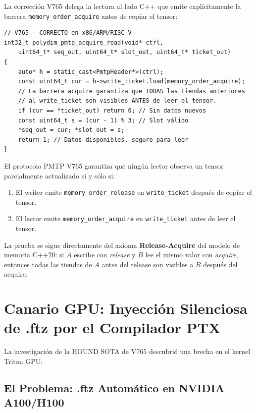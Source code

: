 La corrección V765 delega la lectura al lado C++ que emite explícitamente la barrera
\texttt{memory\_order\_acquire} antes de copiar el tensor:

\begin{lstlisting}[style=cppstyle, caption={Lectura atómica con barrera acquire: segura en ARM}]
// V765 — CORRECTO en x86/ARM/RISC-V
int32_t polydim_pmtp_acquire_read(void* ctrl,
    uint64_t* seq_out, uint64_t* slot_out, uint64_t* ticket_out)
{
    auto* h = static_cast<PmtpHeader*>(ctrl);
    const uint64_t cur = h->write_ticket.load(memory_order_acquire);
    // La barrera acquire garantiza que TODAS las tiendas anteriores
    // al write_ticket son visibles ANTES de leer el tensor.
    if (cur == *ticket_out) return 0; // Sin datos nuevos
    const uint64_t s = (cur - 1) % 3; // Slot válido
    *seq_out = cur; *slot_out = s;
    return 1; // Datos disponibles, seguro para leer
}
\end{lstlisting}

\begin{theorem}
El protocolo PMTP V765 garantiza que ningún lector observa un tensor parcialmente
actualizado si y sólo si:
\begin{enumerate}
  \item El writer emite \texttt{memory\_order\_release} en \texttt{write\_ticket} después de copiar el tensor.
  \item El lector emite \texttt{memory\_order\_acquire} en \texttt{write\_ticket} antes de leer el tensor.
\end{enumerate}
La prueba se sigue directamente del axioma \textbf{Release-Acquire} del modelo de memoria C++20:
si $A$ escribe con \emph{release} y $B$ lee el mismo valor con \emph{acquire}, entonces
todas las tiendas de $A$ antes del release son visibles a $B$ después del acquire.
\end{theorem}

\section{Canario GPU: Inyección Silenciosa de .ftz por el Compilador PTX}

La investigación de la HOUND SOTA de V765 descubrió una brecha en el kernel Triton GPU:

\subsection{El Problema: .ftz Automático en NVIDIA A100/H100}

